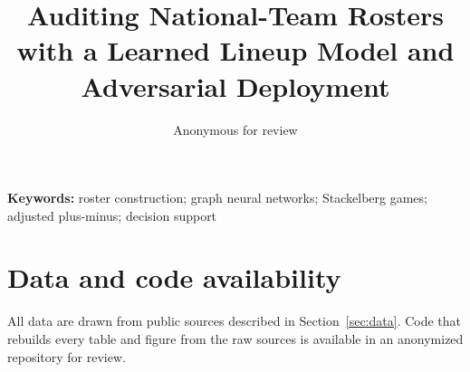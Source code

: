 \documentclass[11pt]{article}
\title{Auditing National-Team Rosters with a Learned Lineup Model and Adversarial Deployment}
\author{Anonymous for review}
\date{}
\begin{document}
\maketitle

\begin{abstract}

\end{abstract}

\noindent\textbf{Keywords:} roster construction; graph neural networks; Stackelberg games; adjusted plus-minus; decision support











\section*{Data and code availability}
All data are drawn from public sources described in Section~\ref{sec:data}. Code that rebuilds every table and figure from the raw sources is available in an anonymized repository for review.




\appendix

\end{document}
